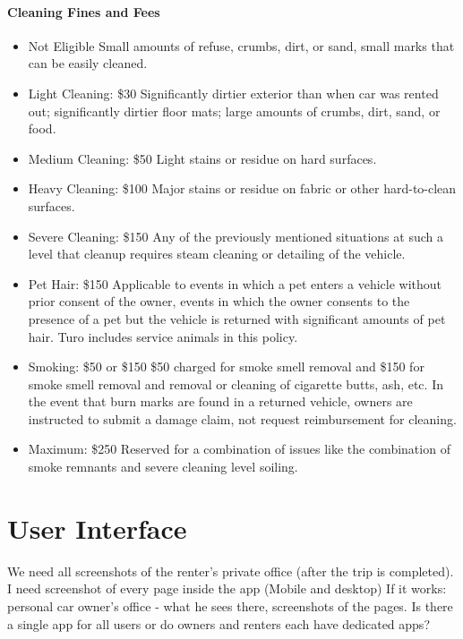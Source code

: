 \documentclass[review,12pt]{elsarticle}
\begin{document}
    \paragraph{Cleaning Fines and Fees}
    \begin{itemize}
      \item Not Eligible
      Small amounts of refuse, crumbs, dirt, or sand, small marks that can be easily cleaned.
      \item Light Cleaning: \$30
      Significantly dirtier exterior than when car was rented out; significantly dirtier floor mats; large amounts of crumbs, dirt, sand, or food.
      \item Medium Cleaning: \$50
      Light stains or residue on hard surfaces.
      \item Heavy Cleaning: \$100
      Major stains or residue on fabric or other hard-to-clean surfaces.
      \item Severe Cleaning: \$150
      Any of the previously mentioned situations at such a level that cleanup requires steam cleaning or detailing of the vehicle.
      \item Pet Hair: \$150
      Applicable to events in which a pet enters a vehicle without prior consent of the owner, events in which the owner consents to the presence of a pet but the vehicle is returned with significant amounts of pet hair. Turo includes service animals in this policy.
      \item Smoking: \$50 or \$150
      \$50 charged for smoke smell removal and \$150 for smoke smell removal and removal or cleaning of cigarette butts, ash, etc. In the event that burn marks are found in a returned vehicle, owners are instructed to submit a damage claim, not request reimbursement for cleaning.
      \item Maximum: \$250
      Reserved for a combination of issues like the combination of smoke remnants and severe cleaning level soiling.

    \end{itemize}

\section{User Interface}
We need all screenshots of the renter’s private office (after the trip is completed). I need screenshot of every page inside the app (Mobile and desktop)
If it works: personal car owner's office - what he sees there, screenshots of the pages.
Is there a single app for all users or do owners and renters each have dedicated apps?
\end{document}
